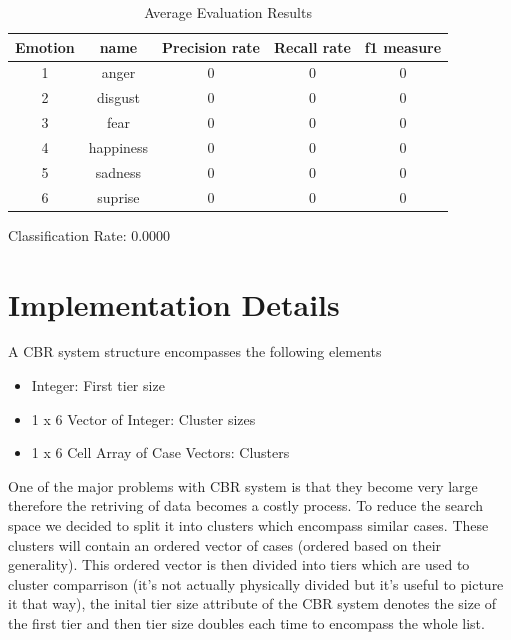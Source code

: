 \documentclass[11pt]{article}
\begin{document}
\begin{table}[H]
\caption{Average Evaluation Results} %
\centering %
\begin{tabular}{c c c c c} %
\hline\hline %
Emotion & name & Precision rate & Recall rate & f1 measure\\ [0.5ex] %
\hline %
1 & anger     & 0 & 0 & 0\\ %
2 & disgust   & 0 & 0 & 0\\
3 & fear      & 0 & 0 & 0\\
4 & happiness & 0 & 0 & 0\\
5 & sadness   & 0 & 0 & 0\\ 
6 & suprise   & 0 & 0 & 0\\ [1ex] %
\hline %
\end{tabular}
\label{table:sixevaluation} %
\end{table}

Classification Rate: 0.0000


\section{Implementation Details}

A CBR system structure encompasses the following elements 
\begin{itemize}
\item{Integer:                            First tier size}
\item{1 x 6 Vector of Integer:            Cluster sizes  }
\item{1 x 6 Cell Array of Case Vectors:   Clusters       }
\end{itemize}

One of the major problems with CBR system is that they become very large therefore the retriving of data becomes a costly process.
To reduce the search space we decided to split it into clusters which encompass similar cases. These clusters will contain an ordered vector of cases (ordered based on their generality). This ordered vector is then divided into tiers which are used to cluster comparrison (it's not actually physically divided but it's useful to picture it that way), the inital tier size attribute of the CBR system denotes the size of the first tier and then tier size doubles each time to encompass the whole list.
\end{document}
